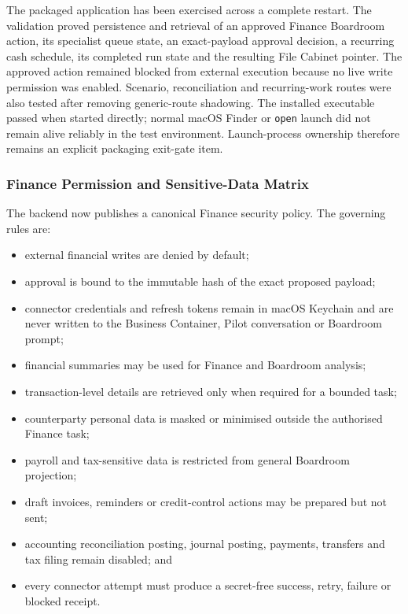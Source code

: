 The packaged application has been exercised across a complete restart.  The validation
proved persistence and retrieval of an approved Finance Boardroom action, its specialist
queue state, an exact-payload approval decision, a recurring cash schedule, its completed
run state and the resulting File Cabinet pointer.  The approved action remained blocked
from external execution because no live write permission was enabled.  Scenario,
reconciliation and recurring-work routes were also tested after removing generic-route
shadowing.  The installed executable passed when started directly; normal macOS Finder or
\texttt{open} launch did not remain alive reliably in the test environment.  Launch-process
ownership therefore remains an explicit packaging exit-gate item.

\subsubsection{Finance Permission and Sensitive-Data Matrix}

The backend now publishes a canonical Finance security policy.  The governing rules are:

\begin{itemize}
  \item external financial writes are denied by default;
  \item approval is bound to the immutable hash of the exact proposed payload;
  \item connector credentials and refresh tokens remain in macOS Keychain and are never
        written to the Business Container, Pilot conversation or Boardroom prompt;
  \item financial summaries may be used for Finance and Boardroom analysis;
  \item transaction-level details are retrieved only when required for a bounded task;
  \item counterparty personal data is masked or minimised outside the authorised Finance task;
  \item payroll and tax-sensitive data is restricted from general Boardroom projection;
  \item draft invoices, reminders or credit-control actions may be prepared but not sent;
  \item accounting reconciliation posting, journal posting, payments, transfers and tax filing
        remain disabled; and
  \item every connector attempt must produce a secret-free success, retry, failure or blocked receipt.
\end{itemize}


